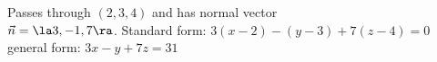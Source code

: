 {Passes through $(2,3,4)$ and has normal vector\\ $\vec n= \la 3,-1,7\ra$.
}
{Standard form: $3(x-2)-(y-3)+7(z-4)=0$\\
general form: $3x-y+7z=31$
}

